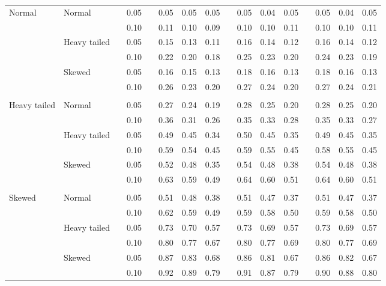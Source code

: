 \begin{table}[ht]
\begin{scriptsize}
\begin{center}
\begin{tabular}{ll p{.1cm} c p{.1cm} rrr p{.1cm} rrr p{.1cm} rrr}
\rowcolor{gray!20}Normal       & Normal       && 0.05 &&   0.05 & 0.05 & 0.05 && 0.05 & 0.04 & 0.05 && 0.05 & 0.04 & 0.05 \\ 
\rowcolor{gray!20}             &              && 0.10 &&   0.11 & 0.10 & 0.09 && 0.10 & 0.10 & 0.11 && 0.10 & 0.10 & 0.11 \\ 
\rowcolor{gray!20}             & Heavy tailed && 0.05 &&   0.15 & 0.13 & 0.11 && 0.16 & 0.14 & 0.12 && 0.16 & 0.14 & 0.12 \\ 
\rowcolor{gray!20}             &              && 0.10 &&   0.22 & 0.20 & 0.18 && 0.25 & 0.23 & 0.20 && 0.24 & 0.23 & 0.19 \\ 
\rowcolor{gray!20}             & Skewed       && 0.05 &&   0.16 & 0.15 & 0.13 && 0.18 & 0.16 & 0.13 && 0.18 & 0.16 & 0.13 \\ 
\rowcolor{gray!20}             &              && 0.10 &&   0.26 & 0.23 & 0.20 && 0.27 & 0.24 & 0.20 && 0.27 & 0.24 & 0.21 \\ 
             &&&&&&&&&&&&&&&\\
Heavy tailed & Normal       && 0.05 &&   0.27 & 0.24 & 0.19 && 0.28 & 0.25 & 0.20 && 0.28 & 0.25 & 0.20 \\ 
             &              && 0.10 &&   0.36 & 0.31 & 0.26 && 0.35 & 0.33 & 0.28 && 0.35 & 0.33 & 0.27 \\ 
             & Heavy tailed && 0.05 &&   0.49 & 0.45 & 0.34 && 0.50 & 0.45 & 0.35 && 0.49 & 0.45 & 0.35 \\ 
             &              && 0.10 &&   0.59 & 0.54 & 0.45 && 0.59 & 0.55 & 0.45 && 0.58 & 0.55 & 0.45 \\ 
             & Skewed       && 0.05 &&   0.52 & 0.48 & 0.35 && 0.54 & 0.48 & 0.38 && 0.54 & 0.48 & 0.38 \\ 
             &              && 0.10 &&   0.63 & 0.59 & 0.49 && 0.64 & 0.60 & 0.51 && 0.64 & 0.60 & 0.51 \\
             &&&&&&&&&&&&&&&\\ 
Skewed       & Normal       && 0.05 &&   0.51 & 0.48 & 0.38 && 0.51 & 0.47 & 0.37 && 0.51 & 0.47 & 0.37 \\ 
             &              && 0.10 &&   0.62 & 0.59 & 0.49 && 0.59 & 0.58 & 0.50 && 0.59 & 0.58 & 0.50 \\ 
             & Heavy tailed && 0.05 &&   0.73 & 0.70 & 0.57 && 0.73 & 0.69 & 0.57 && 0.73 & 0.69 & 0.57 \\ 
             &              && 0.10 &&   0.80 & 0.77 & 0.67 && 0.80 & 0.77 & 0.69 && 0.80 & 0.77 & 0.69 \\ 
             & Skewed       && 0.05 &&   0.87 & 0.83 & 0.68 && 0.86 & 0.81 & 0.67 && 0.86 & 0.82 & 0.67 \\ 
             &              && 0.10 &&   0.92 & 0.89 & 0.79 && 0.91 & 0.87 & 0.79 && 0.90 & 0.88 & 0.80 \\ 


\end{tabular}
\end{center}
\end{scriptsize}
\end{table}

